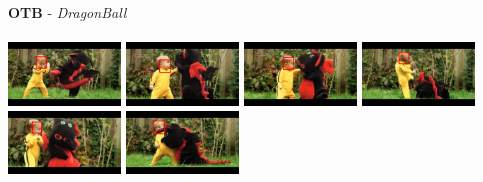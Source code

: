 \documentclass[10pt,twocolumn,letterpaper,french]{article}
\begin{document}
\begin{appendices}
\begin{center}
  \textbf{OTB} - \textit{DragonBall}\\
  \hspace{1cm}\\
  \includegraphics[width=85pt]{images/exemples/ok/baby/000001.png}
  \includegraphics[width=85pt]{images/exemples/ok/baby/000020.png}
  \includegraphics[width=85pt]{images/exemples/ok/baby/000037.png}
  \includegraphics[width=85pt]{images/exemples/ok/baby/000053.png}
  \includegraphics[width=85pt]{images/exemples/ok/baby/000069.png}
  \includegraphics[width=85pt]{images/exemples/ok/baby/000100.png}\\
  \hspace{1cm}\\
  \hspace{1cm}\\


\end{center}
\end{appendices}
\end{document}
